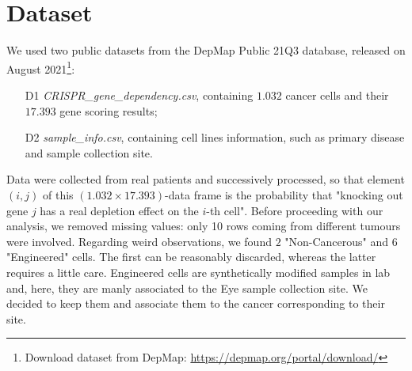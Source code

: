 \documentclass[a4paper,11pt, oneside]{article}  %
\begin{document}
\section{Dataset}
We used two public datasets from the DepMap Public 21Q3 database,  released on August 2021\footnote{Download dataset from DepMap:  \url{https://depmap.org/portal/download/}}:
\begin{itemize}
	\item[D1] \textit{CRISPR\_gene\_dependency.csv},  containing $1.032$ cancer cells and their $17.393$ gene scoring results;
	\item[D2] \textit{sample\_info.csv}, containing cell lines information,  such as primary disease and sample collection site.
\end{itemize}
Data were collected from real patients and successively processed,  so that element $(i, j)$ of this $(1.032 \times 17.393)$-data frame is the probability that "knocking out gene $j$ has a real depletion effect on the $i$-th cell".
Before proceeding with our analysis, we removed missing values: only 10 rows coming from different tumours were involved. Regarding weird observations, we found $2$ "Non-Cancerous" and $6$ "Engineered" cells. The first can be reasonably discarded, whereas the latter requires a little care. Engineered cells are synthetically modified samples in lab and, here, they are manly associated to the Eye sample collection site. We decided to keep them and associate them to the cancer corresponding to their site. 
\end{document}
